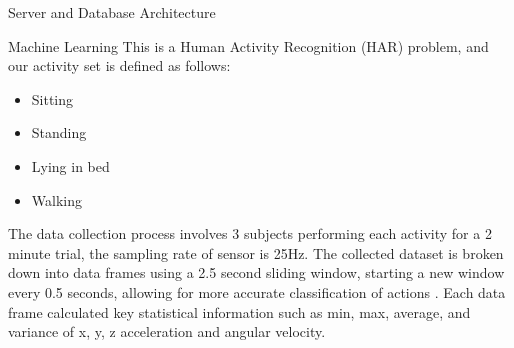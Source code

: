\documentclass[22pt]{beamer}
\begin{document}
\begin{frame}[fragile]
\begin{textblock}{7.25}
\begin{block}{Server and Database Architecture}
\end{block}


\begin{block}{Machine Learning}
This is a Human Activity Recognition (HAR) problem, and our activity set is defined as follows:

\begin{multicols}{2}
\begin{itemize}
\item Sitting
\item Standing
\item Lying in bed
\item Walking
\end{itemize}
\end{multicols}
The data collection process involves 3 subjects performing each activity for a 2 minute trial, the sampling rate of sensor is 25Hz. The collected dataset is broken down into data frames using a 2.5 second sliding window, starting a new window every 0.5 seconds, allowing for more accurate classification of actions \cite{s100201154}. Each data frame calculated key statistical information such as min, max, average, and variance of x, y, z acceleration and angular velocity.

\begin{figure}


\end{figure}
\end{block}
\end{textblock}
\end{frame}
\end{document}
